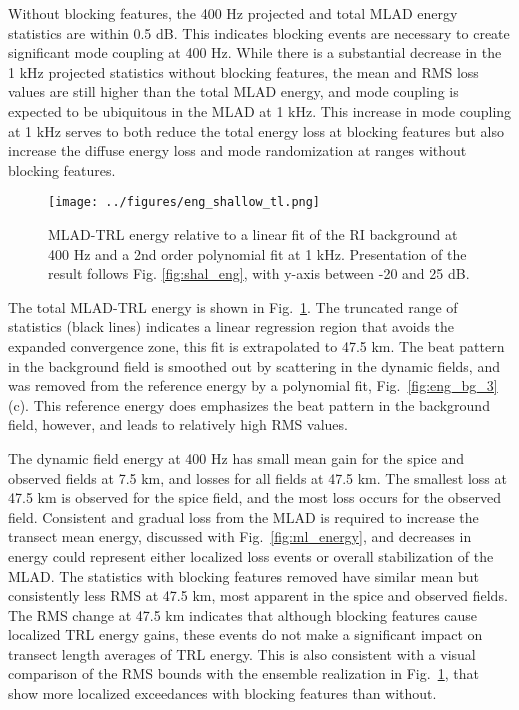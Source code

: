 \documentclass[preprint,NumberedRefs]{JASA}
\begin{document}
Without blocking features, the 400 Hz projected and total MLAD energy statistics are within 0.5 dB. This indicates blocking events are necessary to create significant mode coupling at 400 Hz. While there is a substantial decrease in the 1 kHz projected statistics without blocking features, the mean and RMS loss values are still higher than the total MLAD energy, and mode coupling is expected to be ubiquitous in the MLAD at 1 kHz. This increase in mode coupling at 1 kHz serves to both reduce the total energy loss at blocking features but also increase the diffuse energy loss and mode randomization at ranges without blocking features.

\begin{figure}
\texttt{[image: ../figures/eng\_shallow\_tl.png]}
        \caption{MLAD-TRL energy relative to a linear fit of the RI background at 400 Hz and a 2nd order polynomial fit at 1 kHz. Presentation of the result follows Fig. \ref{fig:shal_eng}, with y-axis between -20 and 25 dB.}
    \label{fig:eng_tl}
\end{figure}
The total MLAD-TRL energy is shown in Fig.~\ref{fig:eng_tl}. The truncated range of statistics (black lines) indicates a linear regression region that avoids the expanded convergence zone, this fit is extrapolated to 47.5 km. The beat pattern in the background field is smoothed out by scattering in the dynamic fields, and was removed from the reference energy by a polynomial fit, Fig.~\ref{fig:eng_bg_3}(c). This reference energy does emphasizes the beat pattern in the background field, however, and leads to relatively high RMS values.

The dynamic field energy at 400 Hz has small mean gain for the spice and observed fields at 7.5 km, and losses for all fields at 47.5 km. The smallest loss at 47.5 km is observed for the spice field, and the most loss occurs for the observed field. Consistent and gradual loss from the MLAD is required to increase the transect mean energy, discussed with Fig.~\ref{fig:ml_energy}, and decreases in energy could represent either localized loss events or overall stabilization of the MLAD. The statistics with blocking features removed have similar mean but consistently less RMS at 47.5 km, most apparent in the spice and observed fields. The RMS change at 47.5 km indicates that although blocking features cause localized TRL energy gains, these events do not make a significant impact on transect length averages of TRL energy. This is also consistent with a visual comparison of the RMS bounds with the ensemble realization in Fig.~\ref{fig:eng_tl}, that show more localized exceedances with blocking features than without.
\end{document}
